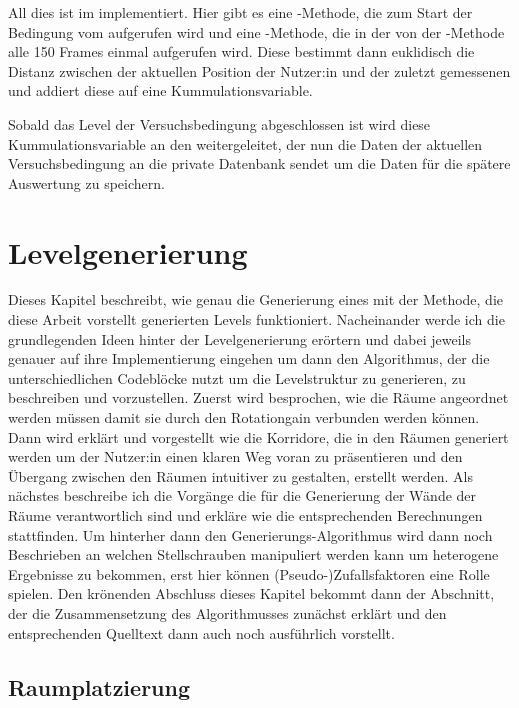 All dies ist im  implementiert. Hier gibt es eine -Methode, die zum Start der Bedingung vom  aufgerufen wird und eine -Methode, die in der von der -Methode alle 150 Frames einmal aufgerufen wird. Diese bestimmt dann euklidisch die Distanz zwischen der aktuellen Position der Nutzer:in und der zuletzt gemessenen und addiert diese auf eine Kummulationsvariable.

Sobald das Level der Versuchsbedingung abgeschlossen ist wird diese Kummulationsvariable an den  weitergeleitet, der nun die Daten der aktuellen Versuchsbedingung an die private Datenbank sendet um die Daten für die spätere Auswertung zu speichern.

\chapter{Levelgenerierung}
\label{chapter:generate}
Dieses Kapitel beschreibt, wie genau die Generierung eines mit der Methode, die diese Arbeit vorstellt generierten Levels funktioniert. Nacheinander werde ich die grundlegenden Ideen hinter der Levelgenerierung erörtern und dabei jeweils genauer auf ihre Implementierung eingehen um dann den Algorithmus, der die unterschiedlichen Codeblöcke nutzt um die Levelstruktur zu generieren, zu beschreiben und vorzustellen.
Zuerst wird besprochen, wie die Räume angeordnet werden müssen damit sie durch den Rotationgain verbunden werden können. Dann wird erklärt und vorgestellt wie die Korridore, die in den Räumen generiert werden um der Nutzer:in einen klaren Weg voran zu präsentieren und den Übergang zwischen den Räumen intuitiver zu gestalten, erstellt werden. Als nächstes beschreibe ich die Vorgänge die für die Generierung der Wände der Räume verantwortlich sind und erkläre wie die entsprechenden Berechnungen stattfinden.
Um hinterher dann den Generierungs-Algorithmus wird dann noch Beschrieben an welchen Stellschrauben manipuliert werden kann um heterogene Ergebnisse zu bekommen, erst hier können (Pseudo-)Zufallsfaktoren eine Rolle spielen.
Den krönenden Abschluss dieses Kapitel bekommt dann der Abschnitt,
der die Zusammensetzung des Algorithmusses zunächst erklärt und den entsprechenden Quelltext dann auch noch ausführlich vorstellt.

\section{Raumplatzierung}

